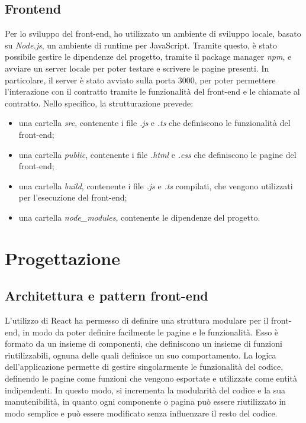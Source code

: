 \subsection{Frontend}
Per lo sviluppo del front-end, ho utilizzato un ambiente di sviluppo locale, basato su \textit{Node.js}, un ambiente di runtime per JavaScript.
Tramite questo, è stato possibile gestire le dipendenze del progetto, tramite il package manager \textit{npm}, e avviare un server locale per poter testare
e scrivere le pagine presenti. In particolare, il server è stato avviato sulla porta 3000, per poter permettere l'interazione con il contratto tramite
le funzionalità del front-end e le chiamate al contratto.
Nello specifico, la strutturazione prevede:
\begin{itemize}
    \item una cartella \textit{src}, contenente i file \textit{.js} e \textit{.ts} che definiscono le funzionalità del front-end;
    \item una cartella \textit{public}, contenente i file \textit{.html} e \textit{.css} che definiscono le pagine del front-end;
    \item una cartella \textit{build}, contenente i file \textit{.js} e \textit{.ts} compilati, che vengono utilizzati per l'esecuzione del front-end;
    \item una cartella \textit{node\_modules}, contenente le dipendenze del progetto.
\end{itemize}

\newpage
\section{Progettazione}\label{sec:progettazione-requisiti}

\subsection{Architettura e pattern front-end}

L'utilizzo di React ha permesso di definire una struttura modulare per il front-end, in modo da poter definire facilmente le pagine e le funzionalità.
Esso è formato da un insieme di componenti, che definiscono un insieme di funzioni riutilizzabili, ognuna delle quali definisce un suo comportamento. 
La logica dell'applicazione permette di gestire singolarmente le funzionalità del codice, definendo le pagine come funzioni che vengono
esportate e utilizzate come entità indipendenti. In questo modo, si incrementa la modularità del codice e la sua manutenibilità, in quanto ogni componente
o pagina può essere riutilizzato in modo semplice e può essere modificato senza influenzare il resto del codice. \\

